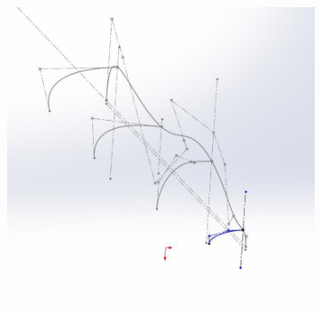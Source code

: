 \begin{figure}
    \begin{subfigure}[m]{.65\linewidth}
        \centering
        \includegraphics[width=\textwidth]{assets/conception1/img173.jpg}
    \end{subfigure}
    \hfill
    \begin{subfigure}[m]{.3\linewidth}
        \centering

\end{subfigure}
\end{figure}
